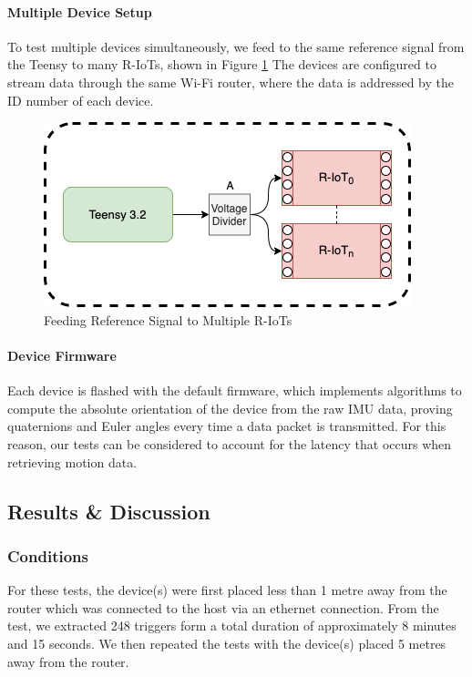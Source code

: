 \paragraph{Multiple Device Setup}
To test multiple devices simultaneously, we feed to the same reference signal from the Teensy to many R-IoTs, shown in Figure \ref{fig:latency_fig2} The devices are configured to stream data through the same Wi-Fi router, where the data is addressed by the ID number of each device.

\begin{figure}[ht]
  \centering
    \includegraphics[width=\textwidth]{Chapters/Figures/technical/Latency/figure2.png}
    \caption{Feeding Reference Signal to Multiple R-IoTs}
    \label{fig:latency_fig2}
\end{figure}

\paragraph{Device Firmware}
Each device is flashed with the default firmware, which implements algorithms to compute the absolute orientation of the device from the raw IMU data, proving quaternions and Euler angles every time a data packet is transmitted. For this reason, our tests can be considered to account for the latency that occurs when retrieving motion data.

\subsection{Results \& Discussion}

\subsubsection{Conditions}
For these tests, the device(s) were first placed less than 1 metre away from the router which was connected to the host via an ethernet connection. From the test, we extracted 248 triggers form a total duration of approximately 8 minutes and 15 seconds. We then repeated the tests with the device(s) placed 5 metres away from the router.

